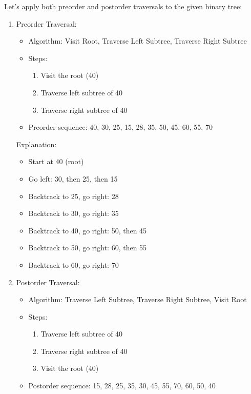 Let's apply both preorder and postorder traversals to the given binary
tree:

\begin{enumerate}
\def\labelenumi{\arabic{enumi}.}
\tightlist
\item
  Preorder Traversal:

  \begin{itemize}
  \tightlist
  \item
    Algorithm: Visit Root, Traverse Left Subtree, Traverse Right Subtree
  \item
    Steps:

    \begin{enumerate}
    \def\labelenumii{\arabic{enumii}.}
    \tightlist
    \item
      Visit the root (40)
    \item
      Traverse left subtree of 40
    \item
      Traverse right subtree of 40
    \end{enumerate}
  \item
    Preorder sequence: 40, 30, 25, 15, 28, 35, 50, 45, 60, 55, 70
  \end{itemize}

  Explanation:

  \begin{itemize}
  \tightlist
  \item
    Start at 40 (root)
  \item
    Go left: 30, then 25, then 15
  \item
    Backtrack to 25, go right: 28
  \item
    Backtrack to 30, go right: 35
  \item
    Backtrack to 40, go right: 50, then 45
  \item
    Backtrack to 50, go right: 60, then 55
  \item
    Backtrack to 60, go right: 70
  \end{itemize}
\item
  Postorder Traversal:

  \begin{itemize}
  \tightlist
  \item
    Algorithm: Traverse Left Subtree, Traverse Right Subtree, Visit Root
  \item
    Steps:

    \begin{enumerate}
    \def\labelenumii{\arabic{enumii}.}
    \tightlist
    \item
      Traverse left subtree of 40
    \item
      Traverse right subtree of 40
    \item
      Visit the root (40)
    \end{enumerate}
  \item
    Postorder sequence: 15, 28, 25, 35, 30, 45, 55, 70, 60, 50, 40
  \end{itemize}


\end{enumerate}
